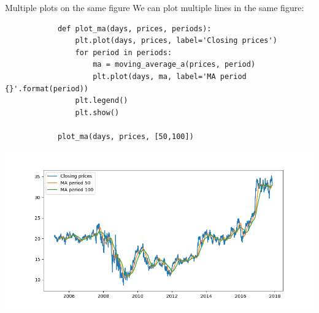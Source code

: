 \documentclass[aspectratio=169,handout]{beamer}
\begin{document}
\begin{frame}[fragile]{Multiple plots on the same figure}
    We can plot multiple lines in the same figure:
    \begin{minipage}{0.49\textwidth}
        \begin{verbatim}
            def plot_ma(days, prices, periods):
                plt.plot(days, prices, label='Closing prices')
                for period in periods:
                    ma = moving_average_a(prices, period)
                    plt.plot(days, ma, label='MA period {}'.format(period))
                plt.legend()
                plt.show()

            plot_ma(days, prices, [50,100])
        \end{verbatim}
    \end{minipage}
    \pause
    \begin{minipage}{0.49\textwidth}
        \begin{flushright}
        \includegraphics[width=.8\textwidth]{./plots/plot5.png}
        \end{flushright}
    \end{minipage}
\end{frame}
\end{document}
